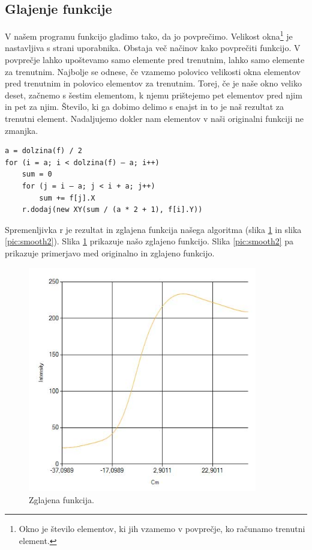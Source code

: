 \documentclass[oneside, a4paper, 12pt]{book}
\begin{document}
\subsection{Glajenje funkcije}
V našem programu funkcijo gladimo tako, da jo povprečimo. Velikost okna\footnote{Okno je število elementov, ki jih vzamemo v povprečje, ko računamo trenutni element.} je nastavljiva s strani uporabnika. Obstaja več načinov kako povprečiti funkcijo. V povprečje lahko upoštevamo samo elemente pred trenutnim, lahko samo elemente za trenutnim. Najbolje se odnese, če vzamemo polovico velikosti okna elementov pred trenutnim in polovico elementov za trenutnim. Torej, če je naše okno veliko deset, začnemo s šestim elementom, k njemu prištejemo pet elementov pred njim in pet za njim. Število, ki ga dobimo delimo s enajst in to je naš rezultat za trenutni element. Nadaljujemo dokler nam elementov v naši originalni funkciji ne zmanjka. 

\begin{verbatim}
a = dolzina(f) / 2
for (i = a; i < dolzina(f) – a; i++)
    sum = 0
    for (j = i – a; j < i + a; j++)
        sum += f[j].X
    r.dodaj(new XY(sum / (a * 2 + 1), f[i].Y))
\end{verbatim}

Spremenljivka r je rezultat in zglajena funkcija našega algoritma (slika \ref{pic:smooth1} in slika \ref{pic:smooth2}).
Slika \ref{pic:smooth1} prikazuje našo zglajeno funkcijo. Slika \ref{pic:smooth2} pa prikazuje primerjavo med originalno in zglajeno funkcijo.

\begin{figure}
\begin{center}
\includegraphics[width=10cm]{slike/glajena-funkcija.jpg}
\end{center}
\caption{Zglajena funkcija.}
\label{pic:smooth1}
\end{figure}
\end{document}
